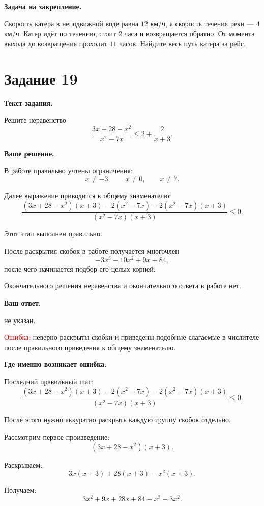 \documentclass[12pt,a4paper]{article}
\newcommand{\errorlabel}[1]{\textcolor{red}{Ошибка:} #1}
\begin{document}
\textbf{Задача на закрепление.}

Скорость катера в неподвижной воде равна $12$ км/ч, а скорость течения
реки --- $4$ км/ч. Катер идёт по течению, стоит $2$ часа и возвращается
обратно. От момента выхода до возвращения проходит $11$ часов.
Найдите весь путь катера за рейс.


\newpage
{}
\label{task:19}

\section*{Задание 19}

\textbf{Текст задания.}

Решите неравенство
\[
\frac{3x+28-x^2}{x^2-7x}
\le
2+\frac{2}{x+3}.
\]

\textbf{Ваше решение.}

В работе правильно учтены ограничения:
\[
x\ne -3,
\qquad
x\ne0,
\qquad
x\ne7.
\]

Далее выражение приводится к общему знаменателю:
\[
\frac{
(3x+28-x^2)(x+3)
-2(x^2-7x)
-2(x^2-7x)(x+3)
}{
(x^2-7x)(x+3)
}
\le0.
\]

Этот этап выполнен правильно.

После раскрытия скобок в работе получается многочлен
\[
-3x^3-10x^2+9x+84,
\]
после чего начинается подбор его целых корней.

Окончательного решения неравенства и окончательного ответа в работе нет.

\textbf{Ваш ответ.}

не указан.

\errorlabel{ неверно раскрыты скобки и приведены подобные слагаемые в числителе после правильного приведения к общему знаменателю.}

\textbf{Где именно возникает ошибка.}

Последний правильный шаг:
\[
\frac{
(3x+28-x^2)(x+3)
-2(x^2-7x)
-2(x^2-7x)(x+3)
}{
(x^2-7x)(x+3)
}
\le0.
\]

После этого нужно аккуратно раскрыть каждую группу скобок отдельно.

Рассмотрим первое произведение:
\[
(3x+28-x^2)(x+3).
\]

Раскрываем:
\[
3x(x+3)+28(x+3)-x^2(x+3).
\]

Получаем:
\[
3x^2+9x+28x+84-x^3-3x^2.
\]
\end{document}
